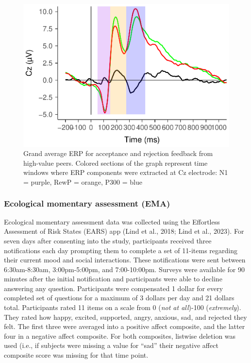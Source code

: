 \documentclass[
  man]{apa7}
\begin{document}
\begin{figure}
\centering
\includegraphics{BUDS_manuscript_working_files/figure-latex/grandAverage-1.pdf}
\caption{\label{fig:grandAverage}Grand average ERP for acceptance and rejection feedback from high-value peers. Colored sections of the graph represent time windows where ERP components were extracted at Cz electrode: N1 = purple, RewP = orange, P300 = blue}
\end{figure}

\hypertarget{ecological-momentary-assessment-ema}{%
\subsubsection{Ecological momentary assessment (EMA)}\label{ecological-momentary-assessment-ema}}

Ecological momentary assessment data was collected using the Effortless Assessment of Risk States (EARS) app (Lind et al., 2018; Lind et al., 2023). For seven days after consenting into the study, participants received three notifications each day prompting them to complete a set of 11-items regarding their current mood and social interactions. These notifications were sent between 6:30am-8:30am, 3:00pm-5:00pm, and 7:00-10:00pm. Surveys were available for 90 minutes after the initial notification and participants were able to decline answering any question. Participants were compensated 1 dollar for every completed set of questions for a maximum of 3 dollars per day and 21 dollars total. Participants rated 11 items on a scale from 0 (\emph{not at all})-100 (\emph{extremely}). They rated how happy, excited, supported, angry, anxious, sad, and rejected they felt. The first three were averaged into a positive affect composite, and the latter four in a negative affect composite. For both composites, listwise deletion was used (i.e., if subjects were missing a value for ``sad'' their negative affect composite score was missing for that time point.
\end{document}
